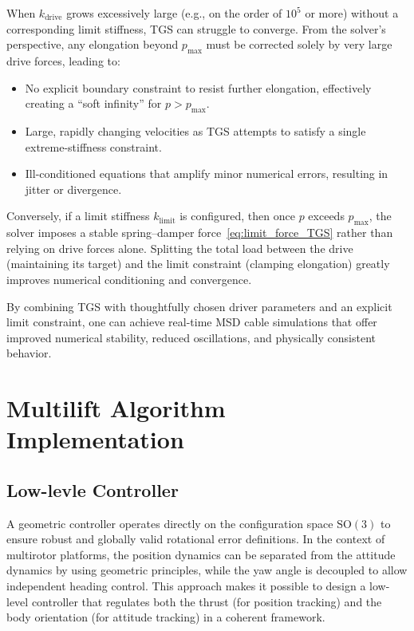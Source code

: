 \documentclass[12pt,twoside,letterpaper]{article}
\begin{document}
When $k_{\text{drive}}$ grows excessively large (e.g., on the order of $10^5$ or more) without a corresponding limit stiffness, TGS can struggle to converge. From the solver's perspective, any elongation beyond $p_{\max}$ must be corrected solely by very large drive forces, leading to:
\begin{itemize}
  \item No explicit boundary constraint to resist further elongation, effectively creating a ``soft infinity'' for $p>p_{\max}$.
  \item Large, rapidly changing velocities as TGS attempts to satisfy a single extreme-stiffness constraint.
  \item Ill-conditioned equations that amplify minor numerical errors, resulting in jitter or divergence.
\end{itemize}
Conversely, if a limit stiffness $k_{\text{limit}}$ is configured, then once $p$ exceeds $p_{\max}$, the solver imposes a stable spring--damper force~\eqref{eq:limit_force_TGS} rather than relying on drive forces alone. Splitting the total load between the drive (maintaining its target) and the limit constraint (clamping elongation) greatly improves numerical conditioning and convergence.


By combining TGS with thoughtfully chosen driver parameters and an explicit limit constraint, one can achieve real-time MSD cable simulations that offer improved numerical stability, reduced oscillations, and physically consistent behavior.


\newpage


\section{Multilift Algorithm Implementation}
\subsection{Low-levle Controller}
A geometric controller\cite{geose3} operates directly on the configuration space \(\mathrm{SO}(3)\) to ensure robust and globally valid rotational error definitions. In the context of multirotor platforms, the position dynamics can be separated from the attitude dynamics by using geometric principles, while the yaw angle is decoupled to allow independent heading control\cite{geoyaw}. This approach makes it possible to design a low-level controller that regulates both the thrust (for position tracking) and the body orientation (for attitude tracking) in a coherent framework.
\end{document}
